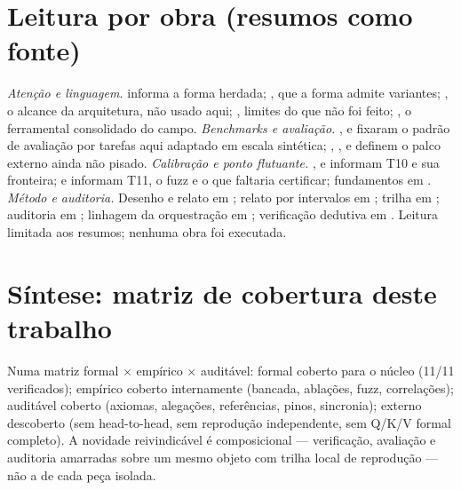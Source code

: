 \section{Leitura por obra (resumos como fonte)}
\textit{Atenção e linguagem.} \cite{vaswani2017} informa a forma herdada; \cite{luong2015}, que a forma admite variantes; \cite{devlin2019}, o alcance da arquitetura, não usado aqui; \cite{dai2019}, limites do que não foi feito; \cite{wolf2020}, o ferramental consolidado do campo. \textit{Benchmarks e avaliação.} \cite{wang2018}, \cite{rajpurkar2016} e \cite{deng2009} fixaram o padrão de avaliação por tarefas aqui adaptado em escala sintética; \cite{agentbench2023}, \cite{perspectivegap2026}, \cite{orchrm2026} e \cite{orchestrator2025} definem o palco externo ainda não pisado. \textit{Calibração e ponto flutuante.} \cite{komisarenko2024}, \cite{xuan2025} e \cite{xie2024} informam T10 e sua fronteira; \cite{bagnara2019} e \cite{murray2026} informam T11, o fuzz e o que faltaria certificar; fundamentos em \cite{muller2018,goldberg1991,harris2020,virtanen2020,meurer2017,demoura2008}. \textit{Método e auditoria.} Desenho e relato em \cite{basili1986,wohlin2012,runeson2009,page2021}; relato por intervalos em \cite{wasserstein2016,cumming2014,efron1979,gneiting2007}; trilha em \cite{osc2015,collberg2016,ioannidis2005,gebru2021,mitchell2019,wilkinson2016}; auditoria em \cite{fagan1976,mccabe1976,chidamber1994,parnas1986}; linhagem da orquestração em \cite{smith1980,erman1980}; verificação dedutiva em \cite{hoare1969,moura2021,mathlib2020}. Leitura limitada aos resumos; nenhuma obra foi executada.
\section{Síntese: matriz de cobertura deste trabalho}
Numa matriz formal $\times$ empírico $\times$ auditável: formal coberto para o núcleo (11/11 verificados); empírico coberto internamente (bancada, ablações, fuzz, correlações); auditável coberto (axiomas, alegações, referências, pinos, sincronia); externo descoberto (sem head-to-head, sem reprodução independente, sem Q/K/V formal completo). A novidade reivindicável é composicional --- verificação, avaliação e auditoria amarradas sobre um mesmo objeto com trilha local de reprodução --- não a de cada peça isolada.
